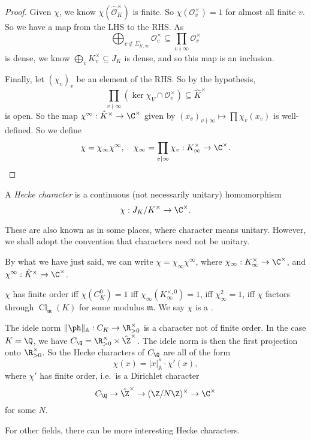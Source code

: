 \documentclass[a4paper]{article}
\newcommand\A{\mathbb{A}}
\DeclareMathOperator\Cl{\mathrm{Cl}}
\begin{document}
\begin{proof}
  Given $\chi$, we know $\chi(\hat{\mathcal{O}}_K^\times)$ is finite. So $\chi(\mathcal{O}_v^\times) = 1$ for almost all finite $v$. So we have a map from the LHS to the RHS. As
  \[
    \bigoplus_{v \not \in \Sigma_{K, \infty}} \mathcal{O}_v^\times \subseteq \prod_{v \nmid \infty} \mathcal{O}_v^\times
  \]
  is dense, we know $\bigoplus_v K_v^\times \subseteq J_K$ is dense, and so this map is an inclusion.

  Finally, let $(\chi_v)_v$ be an element of the RHS. So by the hypothesis,
  \[
    \prod_{v \nmid \infty} (\ker \chi_V \cap \mathcal{O}_v^\times) \subseteq \hat{K}^\times
  \]
  is open. So the map $\chi^\infty: \hat{K}^\times \to \C^\times$ given by $(x_v)_{v \nmid \infty} \mapsto \prod \chi_v(x_v)$ is well-defined. So we define
  \[
    \chi = \chi_\infty \chi^\infty,\quad \chi_\infty = \prod_{v \mid \infty} \chi_v: K_\infty^\times \to \C^\times.
  \]
\end{proof}

\begin{defi}
  A \emph{Hecke character} is a continuous (not necessarily unitary) homomorphism
  \[
    \chi: J_K/K^\times \to \C^\times.
  \]
\end{defi}
These are also known as  in some places, where character means unitary. However, we shall adopt the convention that characters need not be unitary.

By what we have just said, we can write $\chi = \chi_\infty \chi^\infty$, where $\chi_\infty: K_\infty^\times \to \C^\times$, and $\chi^\infty: \hat{K}^\times \to \C^\times$.

\begin{eg}
  $\chi$ has finite order iff $\chi(C_K^0) = 1$ iff $\chi_\infty(K_\infty^{\times, 0}) = 1$, iff $\chi_\infty^2 = 1$, iff $\chi$ factors through $\Cl_\mathfrak{m}(K)$ for some modulus $\mathfrak{m}$. We say $\chi$ is a .
\end{eg}

\begin{eg}
  The idele norm $\|\ph\|_{\A}: C_K \to \R^\times_{>0}$ is a character not of finite order. In the case $K = \Q$, we have $C_\Q = \R_{>0}^\times \times \hat{\Z}^\times$. The idele norm is then the first projection onto $\R_{>0}^\times$. So the Hecke characters of $C_\Q$ are all of the form
  \[
    \chi(x) = |x|_{\A}^s \cdot \chi'(x),
  \]
  where $\chi'$ has finite order, i.e.\ is a Dirichlet character
  \[
    C_\Q \to \hat{\Z}^\times \to (\Z/N\Z)^\times \to \C^\times
  \]
  for some $N$.
\end{eg}
For other fields, there can be more interesting Hecke characters.
\end{document}
